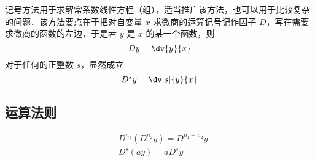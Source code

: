 
\begin{issues}
\issueDraft
\end{issues}

记号方法用于求解常系数线性方程（组），适当推广该方法，也可以用于比较复杂的问题．该方法要点在于把对自变量 $x$ 求微商的运算记号记作因子 $D$，写在需要求微商的函数的左边，于是若 $y$ 是 $x$ 的某一个函数，则
\begin{equation}
Dy=\dv{y}{x}
\end{equation}
对于任何的正整数 $s$，显然成立
\begin{equation}
D^sy=\dv[s]{y}{x}
\end{equation}
\subsection{运算法则}
\begin{equation}
\begin{aligned}
& D^{n_1}(D^{n_2}y)=D^{n_1+n_2}y\\
&D^{s}(ay)=aD^s y\\
&
\end{aligned}
\end{equation}